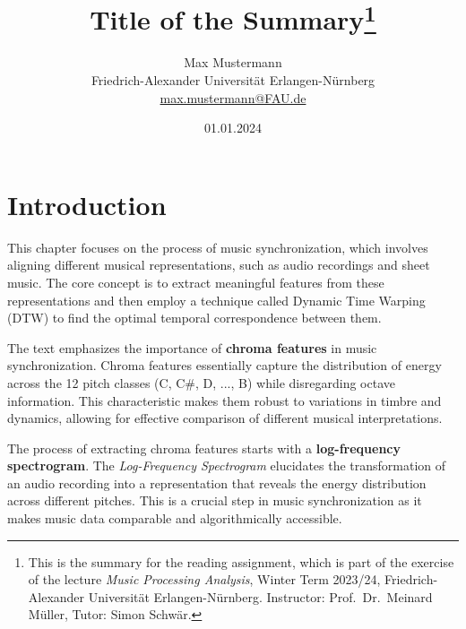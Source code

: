 \documentclass[a4paper, 9pt, twocolumn]{extarticle}
\begin{document}
\date{\normalsize 01.01.2024}

\title{\vspace{-8mm}\textbf{\Large
Title of the Summary\footnote{This is the summary for the reading assignment,
which is part of the exercise of the lecture \emph{Music Processing Analysis}, Winter Term 2023/24,
Friedrich-Alexander Universit\"at Erlangen-N\"urnberg.
Instructor: Prof.\ Dr.\ Meinard M\"uller,
Tutor: Simon Schw\"ar.
}}}

\author{
{
\begin{minipage}{\textwidth}
\center
Max Mustermann\\
\small
Friedrich-Alexander Universit\"at Erlangen-N\"urnberg
\protect\\{} %
\url{max.mustermann@FAU.de}
\end{minipage}
}
}

\maketitle
\thispagestyle{empty}

\section{Introduction}
\label{section:introduction}

This chapter focuses on the process of music synchronization, which
involves aligning different musical representations, such as audio
recordings and sheet music. The core concept is to extract meaningful
features from these representations and then employ a technique called
Dynamic Time Warping (DTW) to find the optimal temporal correspondence
between them.

The text emphasizes the importance of \textbf{chroma features} in music
synchronization. Chroma features essentially capture the distribution of
energy across the 12 pitch classes (C, C\#, D, ..., B) while
disregarding octave information. This characteristic makes them robust
to variations in timbre and dynamics, allowing for effective comparison
of different musical interpretations.

The process of extracting chroma features starts with a
\textbf{log-frequency spectrogram}. The \emph{Log-Frequency Spectrogram}
elucidates the transformation of an audio recording into a
representation that reveals the energy distribution across different
pitches. This is a crucial step in music synchronization as it makes
music data comparable and algorithmically accessible.
\end{document}
